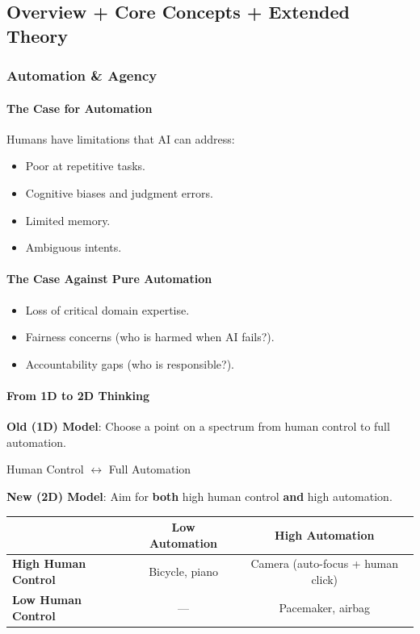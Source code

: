 \subsection{Overview + Core Concepts + Extended Theory}

\subsubsection*{Automation \& Agency}

\paragraph*{The Case for Automation}
Humans have limitations that AI can address:
\begin{itemize}
  \item Poor at repetitive tasks.
  \item Cognitive biases and judgment errors.
  \item Limited memory.
  \item Ambiguous intents.
\end{itemize}

\paragraph*{The Case Against Pure Automation}
\begin{itemize}
  \item Loss of critical domain expertise.
  \item Fairness concerns (who is harmed when AI fails?).
  \item Accountability gaps (who is responsible?).
\end{itemize}

\paragraph*{From 1D to 2D Thinking}

\textbf{Old (1D) Model}: Choose a point on a spectrum from human control to full automation.

\begin{center}
Human Control $\longleftrightarrow$ Full Automation
\end{center}

\textbf{New (2D) Model}: Aim for \textbf{both} high human control \textbf{and} high automation.

\begin{center}
\renewcommand{\arraystretch}{1.3}
\begin{tabular}{@{} l | c c @{}}
& \textbf{Low Automation} & \textbf{High Automation} \\
\midrule
\textbf{High Human Control} & Bicycle, piano & Camera (auto-focus + human click) \\
\textbf{Low Human Control} & --- & Pacemaker, airbag \\
\end{tabular}
\end{center}


